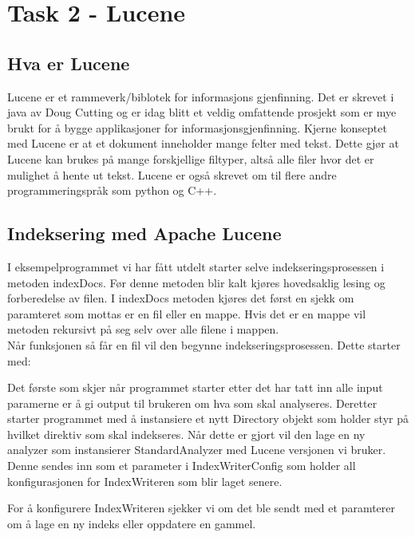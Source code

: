 \lstset{language=Java,
numberstyle=\footnotesize,
basicstyle=\ttfamily\footnotesize,
frame=shadowbox,
breaklines=true}


\section*{Task 2 - Lucene}

\subsection*{Hva er Lucene}
Lucene er et rammeverk/biblotek for informasjons gjenfinning. Det er skrevet i java av Doug Cutting og er idag blitt et veldig omfattende prosjekt som er mye brukt for å bygge applikasjoner for informasjonsgjenfinning. Kjerne konseptet med Lucene er at et dokument inneholder mange felter med tekst. Dette gjør at Lucene kan brukes på mange forskjellige filtyper, altså alle filer hvor det er mulighet å hente ut tekst. Lucene er også skrevet om til flere andre programmeringspråk som python og C++.

\subsection*{Indeksering med Apache Lucene}
I eksempelprogrammet vi har fått utdelt starter selve indekseringsprosessen i metoden indexDocs. Før denne metoden blir kalt kjøres hovedsaklig lesing og forberedelse av filen.
I indexDocs metoden kjøres det først en sjekk om paramteret som mottas er en fil eller en mappe. Hvis det er en mappe vil metoden rekursivt på seg selv over alle filene i mappen.\\
Når funksjonen så får en fil vil den begynne indekseringsprosessen. Dette starter med:


Det første som skjer når programmet starter etter det har tatt inn alle input paramerne er å gi output til brukeren om hva som skal analyseres. Deretter starter programmet med å instansiere et nytt Directory objekt som holder styr på hvilket direktiv som skal indekseres. Når dette er gjort vil den lage en ny analyzer som instansierer StandardAnalyzer med Lucene versjonen vi bruker. Denne sendes inn som et parameter i IndexWriterConfig som holder all konfigurasjonen for IndexWriteren som blir laget senere.


For å konfigurere IndexWriteren sjekker vi om det ble sendt med et paramterer om å lage en ny indeks eller oppdatere en gammel.

